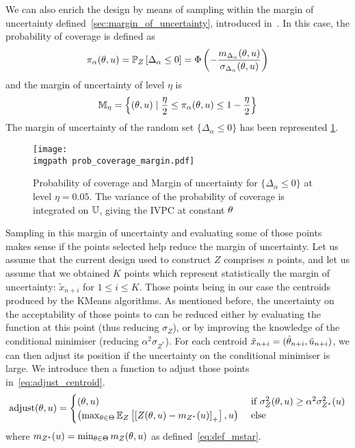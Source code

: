 \documentclass[../../Main_ManuscritThese.tex]{subfiles}
\newcommand\imgpath{/home/victor/acadwriting/Manuscrit/Text/Chapter4/img/}
\begin{document}
We can also enrich the design by means of sampling within the margin
of uncertainty defined~\cref{sec:margin_of_uncertainty}, introduced
in~\cite{echard_ak-mcs_2011,schobi_rare_2017,razaaly_rare_2019}. %
In this case, the probability of coverage is defined as
\begin{equation}
  \pi_{\alpha}(\theta, u) = \mathbb{P}_{Z}\left[\Delta_{\alpha} \leq 0\right] = \Phi\left(-\frac{m_{\Delta_\alpha}(\theta, u)}{\sigma_{\Delta_\alpha}(\theta, u)}\right)
\end{equation}
and the margin of uncertainty of level $\eta$ is 
\begin{equation}
  \mathbb{M}_{\eta} = \left\{ (\theta, u) \mid \frac{\eta}{2} \leq \pi_{\alpha}(\theta, u) \leq 1 - \frac{\eta}{2}\right\}
\end{equation}
The margin of uncertainty of the random set $\{\Delta_{\alpha} \leq 0\}$ has been represented \cref{fig:prob_coverage_margin}.
\begin{figure}[ht]
  \centering
  \texttt{[image: \\imgpath prob\_coverage\_margin.pdf]}
  \caption{\label{fig:prob_coverage_margin} Probability of coverage and Margin of uncertainty for  $\{\Delta_{\alpha} \leq 0\}$ at level $\eta=0.05$. The variance of the probability of coverage is integrated on $\mathbb{U}$, giving the IVPC at constant $\theta$}
\end{figure}

Sampling in this margin of uncertainty and evaluating some of those
points makes sense if the points selected help reduce the margin of
uncertainty.  Let us assume that the current design used to construct
$Z$ comprises $n$ points, and let us assume that we obtained $K$
points which represent statistically the margin of uncertainty:
$\tilde{x}_{n+i}$ for $1\leq i\leq K$. Those points being in our case
the centroids produced by the KMeans algorithms.  As mentioned before,
the uncertainty on the acceptability of those points to can be reduced
either by evaluating the function at this point (thus reducing
$\sigma_Z$), or by improving the knowledge of the conditional
minimiser (reducing $\alpha^2 \sigma_{Z^*}$). For each centroid
$\tilde{x}_{n+i} = (\tilde{\theta}_{n+i}, \tilde{u}_{n+i})$, we can
then adjust its position if the uncertainty on the conditional
minimiser is large. We introduce then a function to adjust those
points in~\cref{eq:adjust_centroid}.
\begin{equation}
  \label{eq:adjust_centroid}
  \mathrm{adjust}(\theta,u) =
  \begin{cases}
    (\theta, u) & \text{ if }\sigma^2_Z(\theta, u) \geq \alpha^2\sigma^2_{Z^*}(u)\\
    \left(\max_{\theta\in\Theta} \mathbb{E}_Z\left[\left[Z(\theta,u) - m_{{Z^*}}(u)\right]_+ \right], u \right) & \text{ else}
  \end{cases}
\end{equation}
where $m_{{Z^*}}(u) = \min_{\theta\in\Theta} m_Z(\theta, u)$ as defined~\eqref{eq:def_mstar}.
\end{document}
